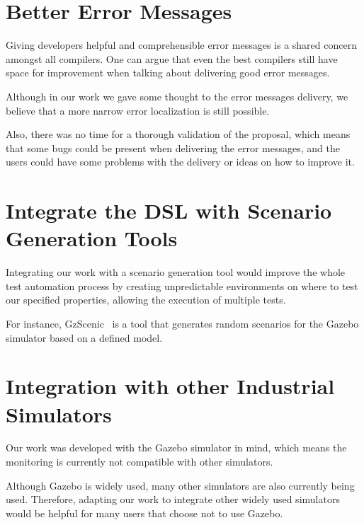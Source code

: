 \section{Better Error Messages}
\label{sec:bettererrormsg}

Giving developers helpful and comprehensible error messages is a shared concern amongst all compilers. One can argue that even the best compilers still have space for improvement when talking about delivering good error messages.

Although in our work we gave some thought to the error messages delivery, we believe that a more narrow error localization is still possible.

Also, there was no time for a thorough validation of the proposal, which means that some bugs could be present when delivering the error messages, and the users could have some problems with the delivery or ideas on how to improve it.


\section{Integrate the DSL with Scenario Generation Tools}
\label{sec:integratescenario}

Integrating our work with a scenario generation tool would improve the whole test automation process by creating unpredictable environments on where to test our specified properties, allowing the execution of multiple tests.

For instance, GzScenic~\cite{AfzalGzScenic} is a tool that generates random scenarios for the Gazebo simulator based on a defined model.


\section{Integration with other Industrial Simulators}
\label{sec:integratesimulators}

Our work was developed with the Gazebo simulator in mind, which means the monitoring is currently not compatible with other simulators.

Although Gazebo is widely used, many other simulators are also currently being used. Therefore, adapting our work to integrate other widely used simulators would be helpful for many users that choose not to use Gazebo.


